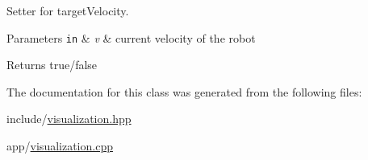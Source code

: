 Setter for target\+Velocity. 


\begin{DoxyParams}[1]{Parameters}
\mbox{\tt in}  & {\em v} & current velocity of the robot \\
\hline
\end{DoxyParams}
\begin{DoxyReturn}{Returns}
true/false 
\end{DoxyReturn}


The documentation for this class was generated from the following files\+:\begin{DoxyCompactItemize}
\item 
include/\hyperlink{visualization_8hpp}{visualization.\+hpp}\item 
app/\hyperlink{visualization_8cpp}{visualization.\+cpp}\end{DoxyCompactItemize}
